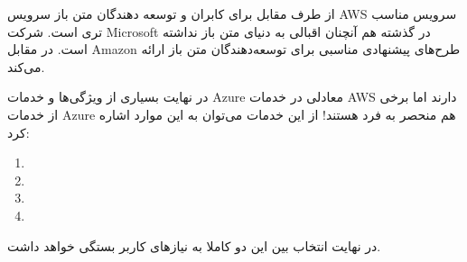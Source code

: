 از طرف مقابل برای کابران و توسعه‌ دهندگان متن باز سرویس AWS سرویس مناسب تری است. شرکت Microsoft در گذشته هم آنچنان اقبالی به دنیای متن باز نداشته است. در مقابل Amazon طرح‌های پیشنهادی مناسبی برای توسعه‌دهندگان متن باز ارائه می‌کند.

در نهایت بسیاری از ویژگی‌ها و خدمات Azure معادلی در خدمات AWS دارند اما برخی از خدمات Azure هم منحصر به فرد هستند!
از این خدمات می‌توان به این موارد اشاره کرد:
\begin{enumerate}
\item {}
\item {}
\item {}
\item {}
\end{enumerate}

در نهایت انتخاب بین این دو کاملا به نیاز‌های کاربر بستگی خواهد داشت.
\cite{Azure-vs-AWS}